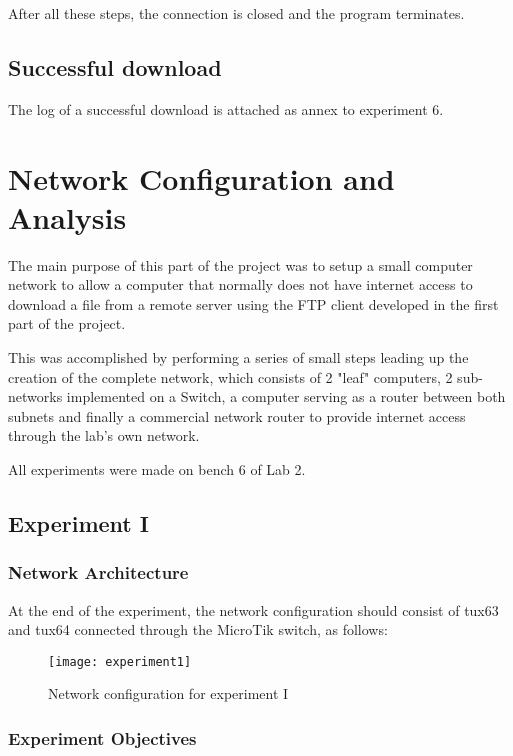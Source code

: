 After all these steps, the connection is closed and the program terminates.

\subsection{Successful download}

The log of a successful download is attached as annex to experiment 6.

\section{Network Configuration and Analysis}

The main purpose of this part of the project was to setup a small computer network to allow a computer that normally does not have internet access to download a file from a remote server using the FTP client developed in the first part of the project.

This was accomplished by performing a series of small steps leading up the creation of the complete network, which consists of 2 "leaf" computers, 2 sub-networks implemented on a Switch, a  computer serving as a router between both subnets and finally a commercial network router to provide internet access through the lab's own network.

All experiments were made on bench 6 of Lab 2.

\subsection{Experiment I}

\subsubsection{Network Architecture}

At the end of the experiment, the network configuration should consist of tux63 and tux64 connected through the MicroTik switch, as follows:

\begin{figure}[H]
    \centering
    \texttt{[image: experiment1]}
    \caption{Network configuration for experiment I}
\end{figure}

\subsubsection{Experiment Objectives}

